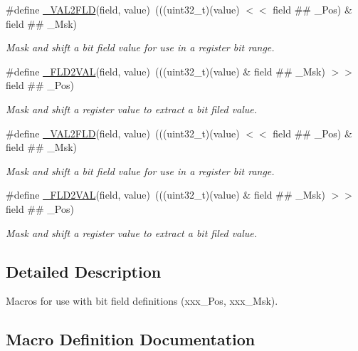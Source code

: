 \begin{DoxyCompactItemize}
\#define \mbox{\hyperlink{group___c_m_s_i_s__core__bitfield_ga286e3b913dbd236c7f48ea70c8821f4e}{\+\_\+\+V\+A\+L2\+F\+LD}}(field,  value)~(((uint32\+\_\+t)(value) $<$$<$ field \#\# \+\_\+\+Pos) \& field \#\# \+\_\+\+Msk)
\begin{DoxyCompactList}\small\item\em Mask and shift a bit field value for use in a register bit range. \end{DoxyCompactList}\item 
\#define \mbox{\hyperlink{group___c_m_s_i_s__core__bitfield_ga139b6e261c981f014f386927ca4a8444}{\+\_\+\+F\+L\+D2\+V\+AL}}(field,  value)~(((uint32\+\_\+t)(value) \& field \#\# \+\_\+\+Msk) $>$$>$ field \#\# \+\_\+\+Pos)
\begin{DoxyCompactList}\small\item\em Mask and shift a register value to extract a bit filed value. \end{DoxyCompactList}\item 
\#define \mbox{\hyperlink{group___c_m_s_i_s__core__bitfield_ga286e3b913dbd236c7f48ea70c8821f4e}{\+\_\+\+V\+A\+L2\+F\+LD}}(field,  value)~(((uint32\+\_\+t)(value) $<$$<$ field \#\# \+\_\+\+Pos) \& field \#\# \+\_\+\+Msk)
\begin{DoxyCompactList}\small\item\em Mask and shift a bit field value for use in a register bit range. \end{DoxyCompactList}\item 
\#define \mbox{\hyperlink{group___c_m_s_i_s__core__bitfield_ga139b6e261c981f014f386927ca4a8444}{\+\_\+\+F\+L\+D2\+V\+AL}}(field,  value)~(((uint32\+\_\+t)(value) \& field \#\# \+\_\+\+Msk) $>$$>$ field \#\# \+\_\+\+Pos)
\begin{DoxyCompactList}\small\item\em Mask and shift a register value to extract a bit filed value. \end{DoxyCompactList}\end{DoxyCompactItemize}


\subsection{Detailed Description}
Macros for use with bit field definitions (xxx\+\_\+\+Pos, xxx\+\_\+\+Msk). 



\subsection{Macro Definition Documentation}
\mbox{\label{group___c_m_s_i_s__core__bitfield_ga139b6e261c981f014f386927ca4a8444}} 
